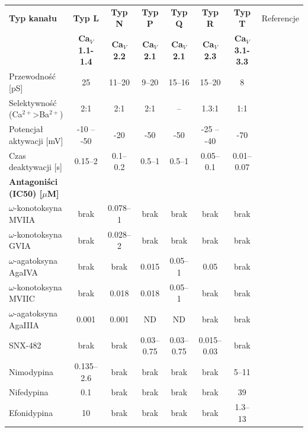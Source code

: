 \begin{landscape}
\begin{table}
	\normalsize
\centering
\begin{tabular}{lccccccr}\toprule[0.12em]
\rule[-2ex]{0pt}{5.5ex}\textbf{Typ kanału} & \textbf{Typ L} & \textbf{Typ N} & \textbf{Typ P} & \textbf{Typ Q} & \textbf{Typ R} & \textbf{Typ T} & Referencje \\
& \textbf{Ca$_V$ 1.1-1.4} & \textbf{Ca$_V$ 2.2} & \textbf{Ca$_V$ 2.1} & \textbf{Ca$_V$ 2.1} & \textbf{Ca$_V$ 2.3} & \textbf{Ca$_V$ 3.1-3.3} & \\\midrule[0.06em]
Przewodność [pS]          & 25 & 11--20 & 9--20  & 15--16 & 15--20 &      8      & \cite{Sharman2013} \\
Selektywność (Ca$^{2+}$>Ba$^{2+}$) & 2:1     & 2:1   & 2:1  & --   & 1.3:1   & 1:1    & \cite{Sharman2013} \\
Potencjał aktywacji [mV]      & -10 -- -50 & -20   & -50  & -50  & -25 -- -40 & -70    & \cite{Sharman2013} \\
Czas deaktywacji [s]        & 0.15--2   & 0.1--0.2 & 0.5--1 & 0.5--1 & 0.05--0.1 & 0.01--0.07 & \cite{Sharman2013} \\\midrule[0.06em]
\textbf{Antagoniści (IC50) [$\mu$M]}& & &  &  & & &\\\midrule[0.06em]
$\omega$-konotoksyna MVIIA & brak & 0.078--1  & brak & brak & brak & brak & \cite{Pringos2011,Sharman2013} \\
$\omega$-konotoksyna GVIA  & brak & 0.028--2  & brak & brak & brak & brak & \cite{Pringos2011,Sharman2013} \\
$\omega$-agatoksyna AgaIVA & brak & brak    & 0.015 & 0.05--1 & 0.05 & brak & \cite{Pringos2011} \\
$\omega$-konotoksyna MVIIC & brak & 0.018   & 0.018 & 0.05--1 & brak & brak & \cite{McDonough1996,Pringos2011} \\
$\omega$-agatoksyna AgaIIIA & 0.001 & 0.001   & ND & ND & brak & brak & \cite{Ertel1994} \\
SNX-482           & brak    & brak & 0.03--0.75 & 0.03--0.75 & 0.015--0.03 & brak & \cite{Arroyo2003,Pringos2011} \\
Nimodypina         & 0.135--2.6 & brak & brak  & brak  & brak & 5--11  & \cite{Catterall2005,Furukawa2009,Stengel1998} \\
Nifedypina         & 0.1    & brak & brak  & brak  & brak & 39   & \cite{Stengel1998} \\
Efonidypina         & 10     & brak & brak  & brak  & brak & 1.3--13 & \cite{Furukawa2009,Masumiya2000} \\

\end{tabular}
\end{table}
\end{landscape}
